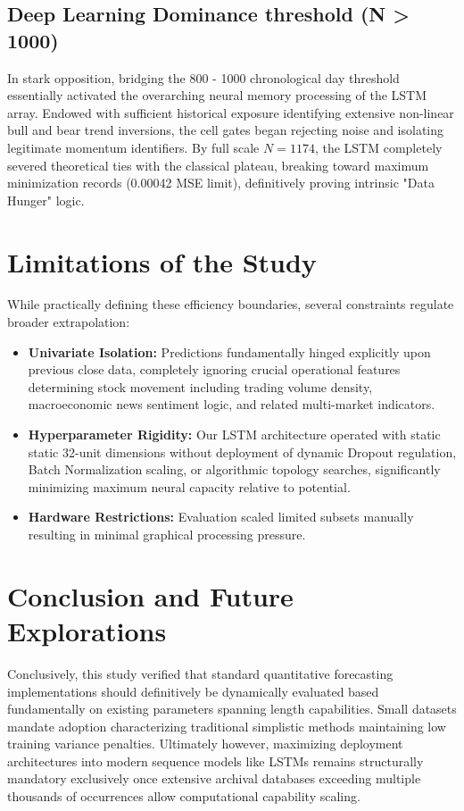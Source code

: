 \documentclass[12pt,onecolumn]{IEEEtran}
\begin{document}
\subsection{Deep Learning Dominance threshold (N > 1000)}
In stark opposition, bridging the 800 - 1000 chronological day threshold essentially activated the overarching neural memory processing of the LSTM array. Endowed with sufficient historical exposure identifying extensive non-linear bull and bear trend inversions, the cell gates began rejecting noise and isolating legitimate momentum identifiers. By full scale $N=1174$, the LSTM completely severed theoretical ties with the classical plateau, breaking toward maximum minimization records (0.00042 MSE limit), definitively proving intrinsic "Data Hunger" logic.

\section{Limitations of the Study}
While practically defining these efficiency boundaries, several constraints regulate broader extrapolation:
\begin{itemize}
    \item \textbf{Univariate Isolation:} Predictions fundamentally hinged explicitly upon previous close data, completely ignoring crucial operational features determining stock movement including trading volume density, macroeconomic news sentiment logic, and related multi-market indicators.
    \item \textbf{Hyperparameter Rigidity:} Our LSTM architecture operated with static static 32-unit dimensions without deployment of dynamic Dropout regulation, Batch Normalization scaling, or algorithmic topology searches, significantly minimizing maximum neural capacity relative to potential.
    \item \textbf{Hardware Restrictions:} Evaluation scaled limited subsets manually resulting in minimal graphical processing pressure. 
\end{itemize}

\section{Conclusion and Future Explorations}
Conclusively, this study verified that standard quantitative forecasting implementations should definitively be dynamically evaluated based fundamentally on existing parameters spanning length capabilities. Small datasets mandate adoption characterizing traditional simplistic methods maintaining low training variance penalties. Ultimately however, maximizing deployment architectures into modern sequence models like LSTMs remains structurally mandatory exclusively once extensive archival databases exceeding multiple thousands of occurrences allow computational capability scaling.
\end{document}
